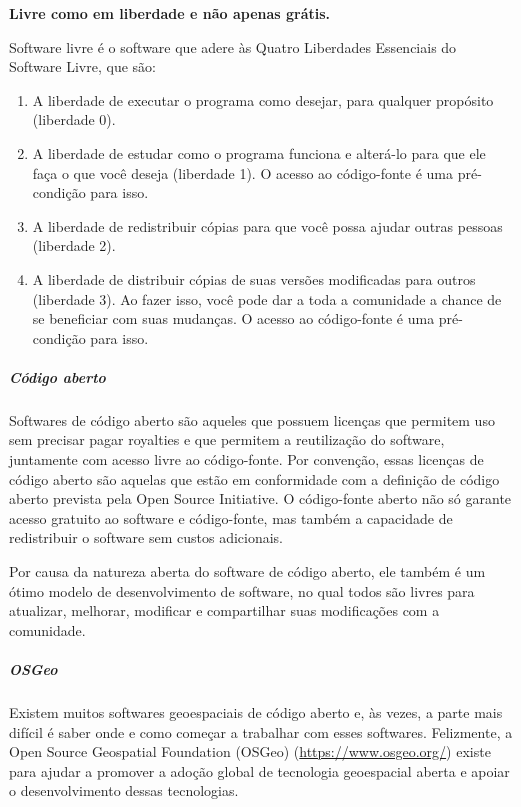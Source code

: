 \documentclass[
]{book}
\providecommand{\tightlist}{%
  \setlength{\itemsep}{0pt}\setlength{\parskip}{0pt}}
\begin{document}
\textbf{Livre como em liberdade e não apenas grátis.}

Software livre é o software que adere às Quatro Liberdades Essenciais do Software Livre, que são:

\begin{enumerate}
\def\labelenumi{\arabic{enumi}.}
\tightlist
\item
  A liberdade de executar o programa como desejar, para qualquer propósito (liberdade 0).
\item
  A liberdade de estudar como o programa funciona e alterá-lo para que ele faça o que você deseja (liberdade 1). O acesso ao código-fonte é uma pré-condição para isso.
\item
  A liberdade de redistribuir cópias para que você possa ajudar outras pessoas (liberdade 2).
\item
  A liberdade de distribuir cópias de suas versões modificadas para outros (liberdade 3). Ao fazer isso, você pode dar a toda a comunidade a chance de se beneficiar com suas mudanças. O acesso ao código-fonte é uma pré-condição para isso.
\end{enumerate}

\hypertarget{cuxf3digo-aberto}{%
\subparagraph{Código aberto}\label{cuxf3digo-aberto}}

Softwares de código aberto são aqueles que possuem licenças que permitem uso sem precisar pagar royalties e que permitem a reutilização do software, juntamente com acesso livre ao código-fonte. Por convenção, essas licenças de código aberto são aquelas que estão em conformidade com a definição de código aberto prevista pela Open Source Initiative. O código-fonte aberto não só garante acesso gratuito ao software e código-fonte, mas também a capacidade de redistribuir o software sem custos adicionais.

Por causa da natureza aberta do software de código aberto, ele também é um ótimo modelo de desenvolvimento de software, no qual todos são livres para atualizar, melhorar, modificar e compartilhar suas modificações com a comunidade.

\hypertarget{osgeo}{%
\subparagraph{OSGeo}\label{osgeo}}

Existem muitos softwares geoespaciais de código aberto e, às vezes, a parte mais difícil é saber onde e como começar a trabalhar com esses softwares. Felizmente, a Open Source Geospatial Foundation (OSGeo) (\url{https://www.osgeo.org/}) existe para ajudar a promover a adoção global de tecnologia geoespacial aberta e apoiar o desenvolvimento dessas tecnologias.
\end{document}
